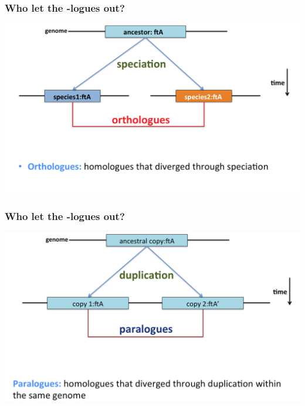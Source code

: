 % 
\begin{frame}
  \frametitle{Who let the -logues out?}
  \begin{center}
    \includegraphics[width=1\textwidth]{images/logues2}  
  \end{center}  
\end{frame}

% 
\begin{frame}
  \frametitle{Who let the -logues out?}
  \begin{center}
    \includegraphics[width=1\textwidth]{images/logues3}  
  \end{center}  
\end{frame}

